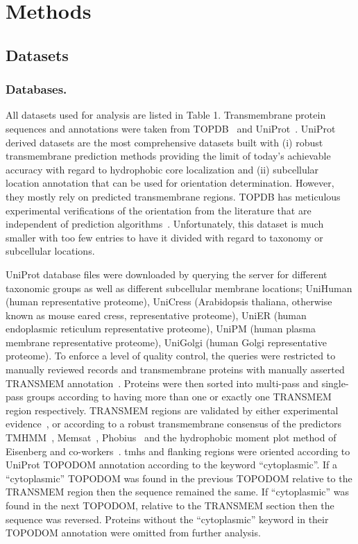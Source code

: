 \section{Methods}

\subsection{Datasets}
\subsubsection{Databases.}
All datasets used for analysis are listed in Table 1. Transmembrane protein sequences and annotations were taken from TOPDB~\cite{Dobson2015} and UniProt~\cite{TheUniProtConsortium2014}. UniProt derived datasets are the most comprehensive datasets built with (i) robust transmembrane prediction methods providing the limit of today’s achievable accuracy with regard to hydrophobic core localization and (ii) subcellular location annotation that can be used for orientation determination. However, they mostly rely on predicted transmembrane regions. TOPDB has meticulous experimental verifications of the orientation from the literature that are independent of prediction algorithms~\cite{Dobson2015}. Unfortunately, this dataset is much smaller with too few entries to have it divided with regard to taxonomy or subcellular locations.

UniProt database files were downloaded by querying the server for different taxonomic groups as well as different subcellular membrane locations; UniHuman (human representative proteome), UniCress (Arabidopsis thaliana, otherwise known as mouse eared cress, representative proteome), UniER (human endoplasmic reticulum representative proteome), UniPM (human plasma membrane representative proteome), UniGolgi (human Golgi representative proteome). To enforce a level of quality control, the queries were restricted to manually reviewed records and transmembrane proteins with manually asserted TRANSMEM annotation~\cite{TheUniProtConsortium2014}. Proteins were then sorted into multi-pass and single-pass groups according to having more than one or exactly one TRANSMEM region respectively. TRANSMEM regions are validated by either experimental evidence~\cite{TheUniProtConsortium2014}, or according to a robust transmembrane consensus of the predictors TMHMM~\cite{Krogh2001}, Memsat~\cite{Jones2007}, Phobius~\cite{Kall2004,Kall2007} and the hydrophobic moment plot method of Eisenberg and co-workers~\cite{Eisenberg1984}. \gls{tmh}s and flanking regions were oriented according to UniProt TOPO\textunderscore DOM annotation according to the keyword “cytoplasmic”. If a “cytoplasmic” TOPO\textunderscore DOM was found in the previous TOPO\textunderscore DOM relative to the TRANSMEM region then the sequence remained the same. If “cytoplasmic” was found in the next TOPO\textunderscore DOM, relative to the TRANSMEM section then the sequence was reversed. Proteins without the “cytoplasmic” keyword in their TOPO\textunderscore DOM annotation were omitted from further analysis.

